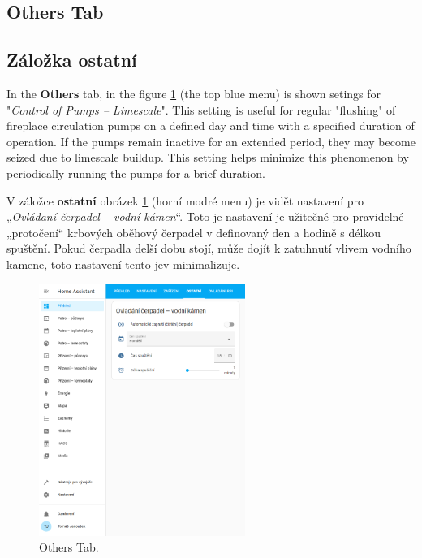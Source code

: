 
\newpage
\begin{English}
\subsection{Others Tab}
\end{English}

\begin{Czech}
\subsection{Záložka ostatní}
\end{Czech}


\begin{English}
In the \textbf{Others} tab, in the figure \ref{fig:tab-others} (the top blue menu) is shown setings for "\textit{Control of Pumps – Limescale}". This setting is useful for regular "flushing" of fireplace circulation pumps on a defined day and time with a specified duration of operation. If the pumps remain inactive for an extended period, they may become seized due to limescale buildup. This setting helps minimize this phenomenon by periodically running the pumps for a brief duration.
\end{English}

\begin{Czech}
V záložce \textbf{ostatní} obrázek \ref{fig:tab-others} (horní modré menu) je vidět nastavení pro „\textit{Ovládaní čerpadel – vodní kámen}“. Toto je nastavení je užitečné pro pravidelné „protočení“ krbových oběhový čerpadel v definovaný den a hodině s délkou spuštění. Pokud čerpadla delší dobu stojí, může dojít k zatuhnutí vlivem vodního kamene, toto nastavení tento jev minimalizuje. 
\end{Czech}


\begin{English}
\begin{figure}[H]
    \centering
    \includegraphics[width=0.6\textwidth]{pictures/czech/software/others-tab.png}
    \caption{Others Tab.}
    \label{fig:tab-others}
\end{figure}
\end{English}

